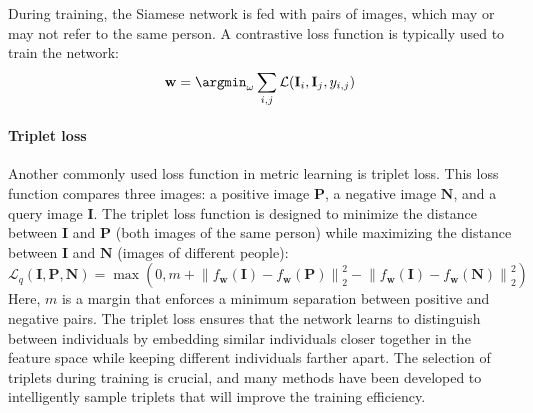 During training, the Siamese network is fed with pairs of images, which may or may not refer to the same person. A contrastive loss function is typically used to train the network:
\[\mathbf{w}=\argmin_\omega\sum_{i,j}\mathcal{L}(\mathbf{I}_i,\mathbf{I}_j,y_{i,j})\]

\paragraph*{Triplet loss}
Another commonly used loss function in metric learning is triplet loss. 
This loss function compares three images: a positive image $\mathbf{P}$, a negative image $\mathbf{N}$, and a query image $\mathbf{I}$. 
The triplet loss function is designed to minimize the distance between $\mathbf{I}$ and $\mathbf{P}$ (both images of the same person) while maximizing the distance between $\mathbf{I}$ and $\mathbf{N}$ (images of different people):
\[\mathcal{L}_q(\mathbf{I}, \mathbf{P}, \mathbf{N}) = \max \left( 0, m + {\left\lVert f_\mathbf{w}(\mathbf{I}) - f_\mathbf{w}(\mathbf{P}) \right\rVert}_2^2 - {\left\lVert f_\mathbf{w}(\mathbf{I}) - f_\mathbf{w}(\mathbf{N}) \right\rVert}_2^2 \right)\]
Here, $m$ is a margin that enforces a minimum separation between positive and negative pairs. 
The triplet loss ensures that the network learns to distinguish between individuals by embedding similar individuals closer together in the feature space while keeping different individuals farther apart.
The selection of triplets during training is crucial, and many methods have been developed to intelligently sample triplets that will improve the training efficiency.